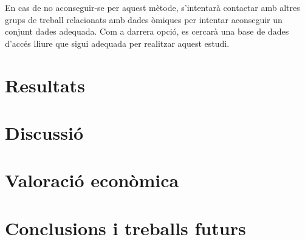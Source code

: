 \documentclass[CAT,BIB]{TFUOC}%
\begin{document}
        En cas de no aconseguir-se per aquest mètode, s'intentarà contactar amb altres grups de treball relacionats amb dades òmiques per intentar aconseguir un conjunt dades adequada. Com a darrera opció, es cercarà una base de dades d'accés lliure que sigui adequada per realitzar aquest estudi.



\chapter{Resultats}

\chapter{Discussió}

\chapter{Valoració econòmica}

\chapter{Conclusions i treballs futurs}
\end{document}

